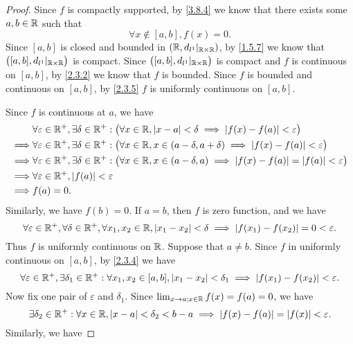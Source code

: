 \begin{proof}
  Since \(f\) is compactly supported, by \cref{3.8.4} we know that there exists some \(a, b \in \mathbb{R}\) such that
  \[
    \forall x \notin [a, b], f(x) = 0.
  \]
  Since \([a, b]\) is closed and bounded in \((\mathbb{R}, d_{l^1}|_{\mathbb{R} \times \mathbb{R}})\), by \cref{1.5.7} we know that \(\big([a, b], d_{l^1}|_{\mathbb{R} \times \mathbb{R}}\big)\) is compact.
  Since \(\big([a, b], d_{l^1}|_{\mathbb{R} \times \mathbb{R}}\big)\) is compact and \(f\) is continuous on \([a, b]\), by \cref{2.3.2} we know that \(f\) is bounded.
  Since \(f\) is bounded and continuous on \([a, b]\), by \cref{2.3.5} \(f\) is uniformly continuous on \([a, b]\).

  Since \(f\) is continuous at \(a\), we have
  \begin{align*}
             & \forall \varepsilon \in \mathbb{R}^+, \exists \delta \in \mathbb{R}^+ : \big(\forall x \in \mathbb{R}, \left\lvert x - a\right\rvert < \delta \implies \left\lvert f(x) - f(a)\right\rvert < \varepsilon\big)               \\
    \implies & \forall \varepsilon \in \mathbb{R}^+, \exists \delta \in \mathbb{R}^+ : \big(\forall x \in \mathbb{R}, x \in (a - \delta, a + \delta) \implies \left\lvert f(x) - f(a)\right\rvert < \varepsilon\big)     \\
    \implies & \forall \varepsilon \in \mathbb{R}^+, \exists \delta \in \mathbb{R}^+ : \big(\forall x \in \mathbb{R}, x \in (a - \delta, a) \implies \left\lvert f(x) - f(a)\right\rvert = \left\lvert f(a)\right\rvert < \varepsilon\big) \\
    \implies & \forall \varepsilon \in \mathbb{R}^+, \left\lvert f(a)\right\rvert < \varepsilon                                                                                                          \\
    \implies & f(a) = 0.
  \end{align*}
  Similarly, we have \(f(b) = 0\).
  If \(a = b\), then \(f\) is zero function, and we have
  \[
    \forall \varepsilon \in \mathbb{R}^+, \forall \delta \in \mathbb{R}^+, \forall x_1, x_2 \in \mathbb{R}, \left\lvert x_1 - x_2\right\rvert < \delta \implies \left\lvert f(x_1) - f(x_2)\right\rvert = 0 < \varepsilon.
  \]
  Thus \(f\) is uniformly continuous on \(\mathbb{R}\).
  Suppose that \(a \neq b\).
  Since \(f\) in uniformly continuous on \([a, b]\), by \cref{2.3.4} we have
  \[
    \forall \varepsilon \in \mathbb{R}^+, \exists \delta_1 \in \mathbb{R}^+ : \forall x_1, x_2 \in [a, b], \left\lvert x_1 - x_2\right\rvert < \delta_1 \implies \left\lvert f(x_1) - f(x_2)\right\rvert < \varepsilon.
  \]
  Now fix one pair of \(\varepsilon\) and \(\delta_1\).
  Since \(\lim_{x \to a ; x \in \mathbb{R}} f(x) = f(a) = 0\), we have
  \[
    \exists \delta_2 \in \mathbb{R}^+ : \forall x \in \mathbb{R}, \left\lvert x - a\right\rvert < \delta_2 < b - a \implies \left\lvert f(x) - f(a)\right\rvert = \left\lvert f(x)\right\rvert < \varepsilon.
  \]
  Similarly, we have

\end{proof}
